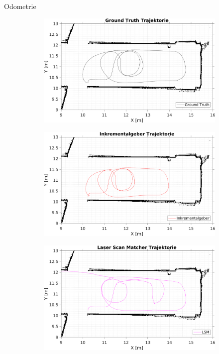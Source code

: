 \documentclass{beamer}
\begin{document}
\begin{frame}{Odometrie}

	\begin{figure}
		\centering
		\begin{subfigure}{0.47\linewidth}
			\centering
			\includegraphics[width=\linewidth]{Record_2018-02-08-12-33-53_trajectory1}
		\end{subfigure}
		\hfill
		\begin{subfigure}{0.47\linewidth}
			\centering
			\includegraphics[width=\linewidth]{Record_2018-02-08-12-33-53_trajectory2}
		\end{subfigure}
		\par
		\bigskip
		\begin{subfigure}{0.47\linewidth}
			\centering
			\includegraphics[width=\linewidth]{Record_2018-02-08-12-33-53_trajectory3}

\end{subfigure}
\end{figure}
\end{frame}
\end{document}

